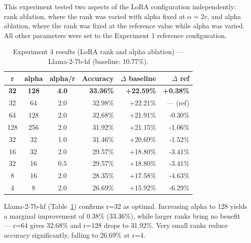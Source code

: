   This experiment tested two aspects of the LoRA
  configuration independently: rank ablation, where
  the rank was varied with alpha fixed at $\alpha = 2r$,
  and alpha ablation, where the rank was fixed at the
  reference value while alpha was varied. All other
  parameters were set to the Experiment 1 reference
  configuration.

\begin{table}[ht]
\caption{Experiment 4 results (LoRA rank and alpha ablation) --- Llama-2-7b-hf (baseline: 10.77\%).}
  \centering
  \footnotesize
  \begin{tabular}{cccrrr}
  \toprule
  \textbf{r} & \textbf{alpha} & \textbf{alpha/r} & \textbf{Accuracy} & \textbf{$\Delta$ baseline} & \textbf{$\Delta$ ref} \\
  \midrule
  \textbf{32} & \textbf{128} & \textbf{4.0} & \textbf{33.36\%} & \textbf{+22.59\%} & \textbf{+0.38\%} \\
  32  & 64  & 2.0 & 32.98\% & +22.21\% & --- (ref) \\
  64  & 128 & 2.0 & 32.68\% & +21.91\% & -0.30\% \\
  128 & 256 & 2.0 & 31.92\% & +21.15\% & -1.06\% \\
  32  & 32  & 1.0 & 31.46\% & +20.69\% & -1.52\% \\
  16  & 32  & 2.0 & 29.57\% & +18.80\% & -3.41\% \\
  32  & 16  & 0.5 & 29.57\% & +18.80\% & -3.41\% \\
  8   & 16  & 2.0 & 28.35\% & +17.58\% & -4.63\% \\
  4   & 8   & 2.0 & 26.69\% & +15.92\% & -6.29\% \\
  \bottomrule
  \end{tabular}

  \label{tab:exp4-llama-hf}
  \end{table}

  Llama-2-7b-hf (Table~\ref{tab:exp4-llama-hf}) confirms r=32 as
  optimal. Increasing alpha to 128 yields a marginal improvement of
  0.38\% (33.36\%), while larger ranks bring no benefit --- r=64 gives
  32.68\% and r=128 drops to 31.92\%. Very small ranks reduce accuracy
  significantly, falling to 26.69\% at r=4.

